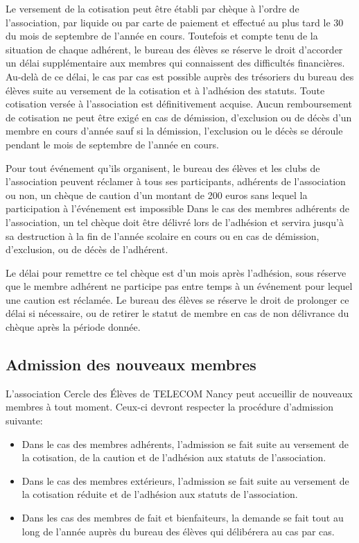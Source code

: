 \documentclass{article} %
\begin{document}
			Le versement de la cotisation peut être établi par chèque à l’ordre
			de l’association, par liquide ou par carte de paiement et effectué
			au plus tard le 30 du mois de septembre de l’année en cours.
			Toutefois et compte tenu de la situation de chaque adhérent, le
			bureau des élèves se réserve le droit d’accorder un délai
			supplémentaire aux membres qui connaissent des difficultés
			financières. Au-delà de ce délai, le cas par cas est possible auprès
			des trésoriers du bureau des élèves suite au versement de la
			cotisation et à l’adhésion des statuts. Toute cotisation versée à
			l’association est définitivement acquise. Aucun remboursement de
			cotisation ne peut être exigé en cas de démission, d’exclusion ou de
			décès d’un membre en cours d’année sauf si la démission, l’exclusion
			ou le décès se déroule pendant le mois de septembre de l’année en
			cours.

			Pour tout événement qu’ils organisent, le bureau des élèves et les
			clubs de l’association peuvent réclamer à tous ses participants,
			adhérents de l’association ou non, un chèque de caution d’un montant
			de 200 euros sans lequel la participation à l’événement est
			impossible Dans le cas des membres adhérents de l’association, un
			tel chèque doit être délivré lors de l’adhésion et servira jusqu’à
			sa destruction à la fin de l’année scolaire en cours ou en cas de
			démission, d’exclusion, ou de décès de l’adhérent. 

			Le délai pour remettre ce tel chèque est d’un mois après l’adhésion,
			sous réserve que le membre adhérent ne participe pas entre temps à
			un événement pour lequel une caution est réclamée. Le bureau des
			élèves se réserve le droit de prolonger ce délai si nécessaire, ou
			de retirer le statut de membre en cas de non délivrance du chèque
			après la période donnée. 

		\subsection{Admission des nouveaux membres}
\label{sub:admission_des_nouveaux_membres}

			L’association Cercle des Élèves de TELECOM Nancy peut accueillir de
			nouveaux membres à tout moment. Ceux-ci devront respecter la
			procédure d’admission suivante:
			\begin{itemize}
				\item Dans le cas des membres adhérents, l’admission se fait
					suite au versement de la cotisation, de la caution et de
					l’adhésion aux statuts de l’association.
				\item Dans le cas des membres extérieurs, l’admission se fait
					suite au versement de la cotisation réduite et de l’adhésion
					aux statuts de l’association.
				\item Dans les cas des membres de fait et bienfaiteurs, la
					demande se fait tout au long de l’année auprès du bureau des
					élèves qui délibérera au cas par cas.
			\end{itemize}
\end{document}
